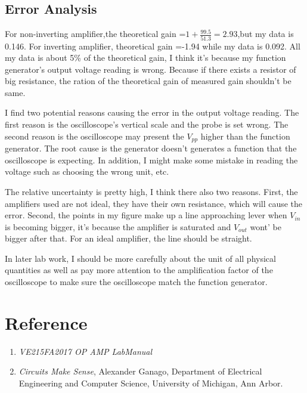 \documentclass[12pt]{article}
\begin{document}
\subsection{Error Analysis}
For non-inverting amplifier,the theoretical gain =$1+\frac{99.5}{51.3}=2.93$,but my data is 0.146. For inverting amplifier, theoretical gain =-1.94 while my data is 0.092. All my data is about 5\% of the theoretical gain, I think it's because my function generator's output voltage reading is wrong. Because if there exists a resistor of big resistance, the ration of the theoretical gain of measured gain shouldn't be same. 
\par I find two potential reasons causing the error in the output voltage reading. The first reason is the oscilloscope's vertical scale and the probe is set wrong. The second reason is the oscilloscope may present the $V_{pp}$ higher than the function generator. The root cause is the generator doesn't generates a function that the oscilloscope is expecting. In addition, I might make some mistake in reading the voltage such as choosing the wrong unit, etc.
\par The relative uncertainty is pretty high, I think there also two reasons. First, the amplifiers used are not ideal, they have their own resistance, which will cause the error. Second, the points in my figure make up a line approaching lever when $V_{in}$ is becoming bigger, it's because the amplifier is saturated and $V_{out}$ wont' be bigger after that. For an ideal amplifier, the line should be straight. 
\par In later lab work, I should be more carefully about the unit of all physical quantities as well as pay more attention to the amplification factor of the oscilloscope to make sure the oscilloscope match the function generator.
\section{Reference}
\begin{enumerate}[-]
\item \emph{VE215FA2017 OP AMP LabManual} 
\item \emph{Circuits Make Sense}, Alexander Ganago, Department of Electrical Engineering and Computer Science, University of Michigan, Ann Arbor.
\end{enumerate}
\end{document}

